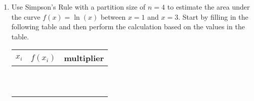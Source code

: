 \documentclass[letterpaper,12pt,fleqn]{article}
\begin{document}
\begin{enumerate}[left=0pt]
\item Use Simpson's Rule with a partition size of \(n=4\) to estimate the area under the curve \(f(x)=\ln(x)\)
  between \(x=1\) and \(x=3\).  Start by filling in the following table and then perform the calculation based on
  the values in the table.

  \vspace{0.5in}

  \begin{tabular}{p{1in}|p{1in}|p{1in}}
    \(x_i\) & \(f(x_i)\) & multiplier \\
    \hline
    & & \\
    & & \\
    \hline
    & & \\
    & & \\
    \hline
    & & \\
    & & \\
    \hline
    & & \\
    & & \\
    \hline
    & & \\
    & &
  \end{tabular}
\end{enumerate}
\end{document}
